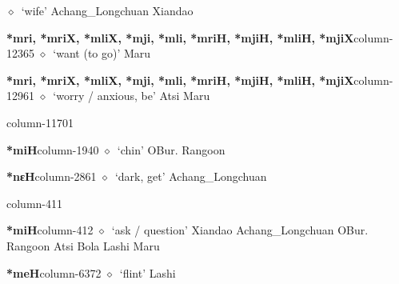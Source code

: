          $\diamond$~`wife'
         Achang\_Longchuan 
\hspace{1ex}
         Xiandao 
  \item {\footnotesize \textbf{*mri, *mriX, *mliX, *mji, *mli, *mriH, *mjiH, *mliH, *mjiX}}{\tiny column-12365}
         $\diamond$~`want (to go)'
         Maru 
  \item {\footnotesize \textbf{*mri, *mriX, *mliX, *mji, *mli, *mriH, *mjiH, *mliH, *mjiX}}{\tiny column-12961}
         $\diamond$~`worry / anxious, be'
         Atsi 
\hspace{1ex}
         Maru 
  \item {\footnotesize \textbf{}}{\tiny column-11701}
  \item {\footnotesize \textbf{*miH}}{\tiny column-1940}
         $\diamond$~`chin'
         OBur. 
\hspace{1ex}
         Rangoon 
  \item {\footnotesize \textbf{*nɛH}}{\tiny column-2861}
         $\diamond$~`dark, get'
         Achang\_Longchuan 
  \item {\footnotesize \textbf{}}{\tiny column-411}
  \item {\footnotesize \textbf{*miH}}{\tiny column-412}
         $\diamond$~`ask / question'
         Xiandao 
\hspace{1ex}
         Achang\_Longchuan 
\hspace{1ex}
         OBur. 
\hspace{1ex}
         Rangoon 
\hspace{1ex}
         Atsi 
\hspace{1ex}
         Bola 
\hspace{1ex}
         Lashi 
\hspace{1ex}
         Maru 
  \item {\footnotesize \textbf{*meH}}{\tiny column-6372}
         $\diamond$~`flint'
         Lashi 
\hspace{1ex}
